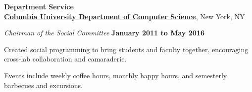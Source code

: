 \documentclass[10pt]{article}
\begin{document}
\vspace{15pt}
\textbf{Department Service}\\
\href{http://www.cs.columbia.edu/}{\textbf{Columbia University Department of Computer Science}}, New York, NY
\vspace{6pt}
\begin{outerlist}
\item[] \textit{Chairman of the Social Committee}
        \hfill \textbf{January 2011 to May 2016}
        \vspace{-6pt}
        \begin{innerlist}
\item Created social programming to bring students and faculty together, encouraging cross-lab collaboration and camaraderie.
\item Events include weekly coffee hours, monthly happy hours, and semesterly barbecues and excursions.
\end{innerlist}
\end{outerlist}
\vspace{15pt}
\end{document}
